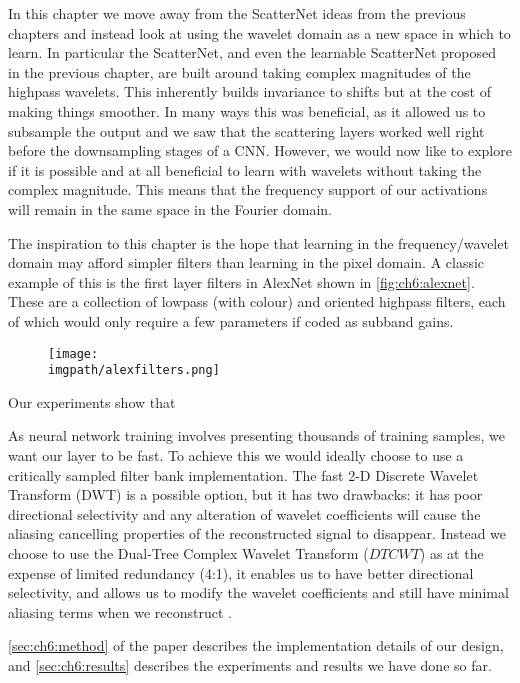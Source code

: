 In this chapter we move away from the ScatterNet ideas from the previous 
chapters and instead look at using the wavelet domain as a new space in which to
learn. In particular the ScatterNet, and even the learnable ScatterNet proposed
in the previous chapter, are built around taking complex magnitudes of the
highpass wavelets. This inherently builds invariance to shifts but at the cost
of making things smoother. In many ways this was beneficial, as it allowed us to
subsample the output and we saw that the scattering layers worked well right
before the downsampling stages of a CNN\@. However, we would now like to explore
if it is possible and at all beneficial to learn with wavelets without taking
the complex magnitude. This means that the frequency support of our activations
will remain in the same space in the Fourier domain.

The inspiration to this chapter is the hope that learning in the
frequency/wavelet domain may afford simpler filters than learning in the pixel
domain. A classic example of this is the first layer filters in AlexNet shown in
\autoref{fig:ch6:alexnet}. These are a collection of lowpass (with colour) and
oriented highpass filters, each of which would only require a few parameters if
coded as subband gains.

\begin{figure}[bt]
  \centering
  \texttt{[image: \\imgpath/alexfilters.png]}
  \label{fig:ch6:alexnet}
\end{figure}

Our experiments show that \ellipsis

As neural network training involves presenting thousands of training samples, we
want our layer to be fast. To achieve this we would ideally choose to use
a critically sampled filter bank implementation. The fast 2-D Discrete Wavelet
Transform (DWT) is a possible option, but it has two drawbacks: it has poor
directional selectivity and any alteration of wavelet coefficients will cause
the aliasing cancelling properties of the reconstructed signal to disappear.
Instead we choose to use the Dual-Tree Complex Wavelet Transform ($DTCWT$)
\cite{selesnick_dual-tree_2005} as at the expense of limited redundancy (4:1),
it enables us to have better directional selectivity, and allows us to modify
the wavelet coefficients and still have minimal aliasing terms when we
reconstruct \cite{kingsbury_complex_2001}.

\autoref{sec:ch6:method} of the paper describes the implementation details of
our design, and \autoref{sec:ch6:results} describes the experiments and results
we have done so far.
